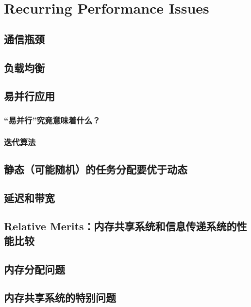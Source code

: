 ﻿\chapter{Recurring Performance Issues}
\label{chap:issues}
\section{通信瓶颈}

\section{负载均衡}

\section{易并行应用}
\label{embpar}

\subsection{``易并行''究竟意味着什么？}

\subsection{迭代算法}

\section{静态（可能随机）的任务分配要优于动态}



\section{延迟和带宽}

\section{Relative Merits：内存共享系统和信息传递系统的性能比较}

\section{内存分配问题}

\section{内存共享系统的特别问题}
